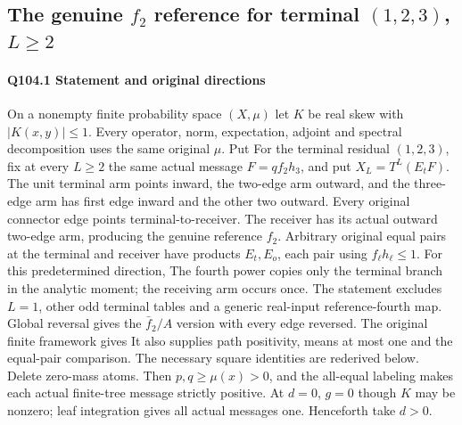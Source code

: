 \subsection{The genuine $f_2$ reference for terminal $(1,\allowbreak 2,\allowbreak 3)$, $L\ge\allowbreak 2$}\label{proof:Q5-C104}
\paragraph{Q104.1 Statement and original directions}\label{part:Q104.1}
On a nonempty finite probability space $(X,\allowbreak \mu)$ let $K$ be real skew
with $|K(x,\allowbreak y)|\le\allowbreak 1$. Every operator, norm, expectation, adjoint and
spectral decomposition uses the same original $\mu$. Put
For the terminal residual $(1,\allowbreak 2,\allowbreak 3)$, fix at every $L\ge\allowbreak 2$ the same actual
message $F=\allowbreak qf_2h_3$, and put $X_L=\allowbreak T^L(E_tF)$.
The unit terminal arm points inward, the two-edge arm outward, and the
three-edge arm has first edge inward and the other two outward.
Every original connector edge points terminal-to-receiver.
The receiver has its actual outward two-edge arm, producing the genuine
reference $f_2$. Arbitrary original equal pairs at the terminal and
receiver have products $E_t,\allowbreak E_o$, each pair using $f_\ell h_\ell\le\allowbreak 1$.
For this predetermined direction,
The fourth power copies only the terminal branch in the analytic moment;
the receiving arm occurs once. The statement excludes $L=\allowbreak 1$, other odd
terminal tables and a generic real-input reference-fourth map.
Global reversal gives the $\bar f_2/A$ version with every edge reversed.
The original finite framework gives
It also supplies path positivity, means at most one and the equal-pair
comparison. The necessary square identities are rederived below.
Delete zero-mass atoms. Then $p,\allowbreak q\ge\allowbreak \mu(x)>\allowbreak 0$, and the all-equal
labeling makes each actual finite-tree message strictly positive.
At $d=\allowbreak 0$, $g=\allowbreak 0$ though $K$ may be nonzero; leaf integration gives
all actual messages one. Henceforth take $d>\allowbreak 0$.

